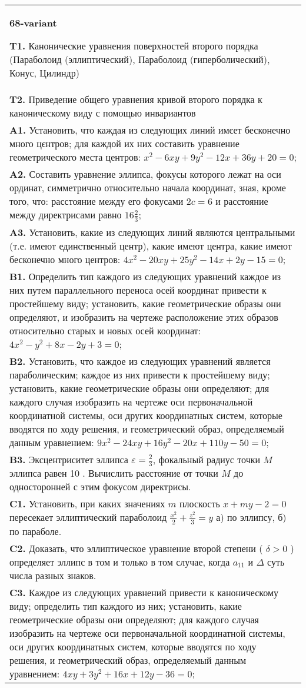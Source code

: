 \documentclass{article}
\begin{document}
\begin{tabular}{m{17cm}}
\textbf{68-variant}
\newline

\textbf{T1.} Канонические уравнения поверхностей второго порядка (Параболоид (эллиптический), Параболоид (гиперболический), Конус, Цилиндр) \\
\textbf{T2.} Приведение общего уравнения кривой второго порядка к каноническому виду с помощью инвариантов \\
\textbf{A1.} Установить, что каждая из следующих линий имєет бесконечно много цєнтров; для каждой их них составить уравнение геометрического места центров: $x^2-6 x y+9 y^2-12 x+36 y+20=0$; \\
\textbf{A2.} Составить уравнение эллипса, фокусы которого лежат на оси ординат, симметрично относительно начала координат, зная, кроме того, что: расстояние между его фокусами $2 c=6$ и расстояние между директрисами равно $16 \frac{2}{3}$; \\
\textbf{A3.} Установить, какие из следующих линий являются центральными (т.е. имеют единственный центр), какие имеют центра, какие имеют бесконечно много центров: $4 x^2-20 x y+25 y^2-14 x+2 y-15=0$; \\
\textbf{B1.} Определить тип каждого из следующих уравнений каждое из них путем параллельного переноса осей координат привести к простейшему виду; установить, какие геометрические образы они определяют, и изобразить на чертеже расположение этих образов относительно старых и новых осей координат: $4 x^2-y^2+8 x-2 y+3=0$; \\
\textbf{B2.} Установить, что каждое из следующих уравнений является параболическим; каждое из них привести к простейшему виду; установить, какие геометрические образы они определяют; для каждого случая изобразить на чертеже оси первоначальной координатной системы, оси других координатных систем, которые вводятся по ходу решения, и геометрический образ, определяемый данным уравнением: $9 x^2-24 x y+16 y^2-20 x+110 y-50=0$; \\
\textbf{B3.} Эксцентриситет эллипса $\varepsilon=\frac{2}{3}$, фокальный радиус точки $M$ эллипса равен 10 . Вычислить расстояние от точки $M$ до односторонней с этим фокусом директрисы. \\
\textbf{C1.} Установить, при каких значениях $m$ плоскость $x+m y-2=0$ пересекает эллиптический параболоид $\frac{x^2}{2}+\frac{z^2}{3}=y$ а) по эллипсу, б) по параболе. \\
\textbf{C2.} Доказать, что эллиптическое уравнение второй степени ( $\delta>0$ ) определяет эллипс в том и только в том случае, когда $a_{11}$ и $\Delta$ суть числа разных знаков. \\
\textbf{C3.} Каждое из следующих уравнений привести к каноническому виду; определить тип каждого из них; установить, какие геометрические образы они определяют; для каждого случая изобразить на чертеже оси первоначальной координатной системы, оси других координатных систем, которые вводятся по ходу решения, и геометрический образ, определяемый данным уравнением: $4 x y+3 y^2+16 x+12 y-36=0$; \\

\end{tabular}
\vspace{1cm}
\end{document}
